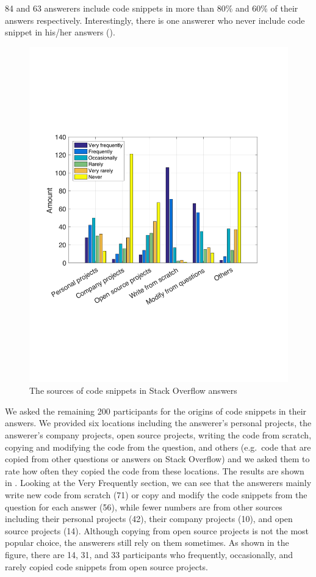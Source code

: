 \documentclass[10pt,journal,compsoc]{IEEEtran}
\begin{document}
84 and 63 answerers include code snippets in more than 80\% and 60\% of
their answers respectively. Interestingly, there is one answerer who never
include code snippet in his/her answers ().

\begin{figure}
	\centering
	\includegraphics[width=0.9\linewidth]{survey_snippet_source}
	\caption{The sources of code snippets in Stack Overflow answers}
	\label{fig:survey_snippet_source}
\end{figure}

We asked the remaining 200 participants for the origins of code snippets in
their answers. We provided six locations including the answerer's personal
projects, the answerer's company projects, open source projects, writing the
code from scratch, copying and modifying the code from the question, and others
(e.g.\ code that are copied from other questions or answers on Stack Overflow)
and we asked them to rate how often they copied the code from these locations. The
results are shown in . Looking at the Very
Frequently section, we can see that the answerers mainly write new code from
scratch (71) or copy and modify the code snippets from the question for each answer (56),
while fewer numbers are from other sources including their personal projects
(42), their company projects (10), and open source projects (14). Although
copying from open source projects is not the most popular choice, the answerers
still rely on them sometimes. As shown in the figure, there are 14, 31, and 33
participants who frequently, occasionally, and rarely copied code snippets from
open source projects.
\end{document}
